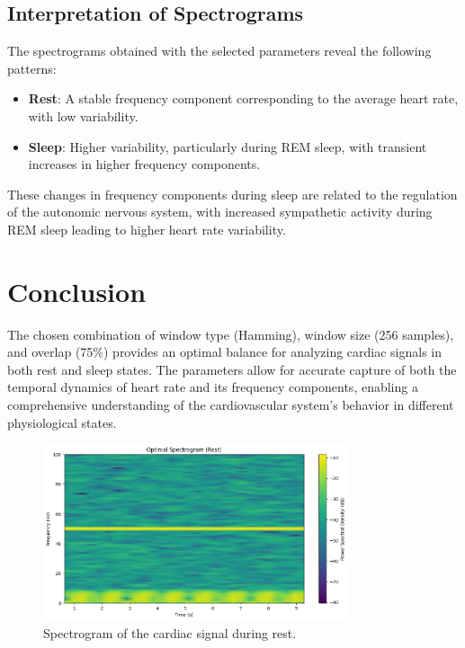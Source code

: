 \documentclass[10pt]{article}
\theoremstyle{definition}
\theoremstyle{remark}
\theoremstyle{definition}
\numberwithin{equation}{prob}
\begin{document}
\subsection{Interpretation of Spectrograms}

The spectrograms obtained with the selected parameters reveal the following patterns:
\begin{itemize}
    \item \textbf{Rest}: A stable frequency component corresponding to the average heart rate, with low variability.
    \item \textbf{Sleep}: Higher variability, particularly during REM sleep, with transient increases in higher frequency components.
\end{itemize}

These changes in frequency components during sleep are related to the regulation of the autonomic nervous system, with increased sympathetic activity during REM sleep leading to higher heart rate variability.

\section*{Conclusion}

The chosen combination of window type (Hamming), window size (256 samples), and overlap (75\%) provides an optimal balance for analyzing cardiac signals in both rest and sleep states. The parameters allow for accurate capture of both the temporal dynamics of heart rate and its frequency components, enabling a comprehensive understanding of the cardiovascular system's behavior in different physiological states.

\begin{figure}[H]
    \centering
    \includegraphics[width=0.8\textwidth]{./figures/Optimal Spectrogram Rest.png}
    \caption{Spectrogram of the cardiac signal during rest.}
\end{figure}
\end{document}
